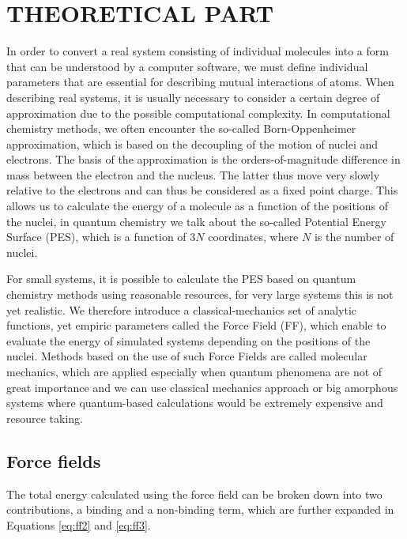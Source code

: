\newpage
\section{THEORETICAL PART}

In order to convert a real system consisting of individual molecules into a form that can be understood by a computer software, we must define individual parameters that are essential for describing mutual interactions of atoms. When describing real systems, it is usually necessary to consider a certain degree of approximation due to the possible computational complexity. In computational chemistry methods, we often encounter the so-called Born-Oppenheimer approximation, which is based on the decoupling of the motion of nuclei and electrons. The basis of the approximation is the orders-of-magnitude difference in mass between the electron and the nucleus. The latter thus move very slowly relative to the electrons and can thus be considered as a fixed point charge. This allows us to calculate the energy of a molecule as a function of the positions of the nuclei, in quantum chemistry we talk about the so-called Potential Energy Surface (PES), which is a function of 3$N$ coordinates, where $N$ is the number of nuclei. \cite{leach_molecular_2001} 

For small systems, it is possible to calculate the PES based on quantum chemistry methods using reasonable resources, for very large systems this is not yet realistic. We therefore introduce a classical-mechanics set of analytic functions, yet empiric parameters called the Force Field (FF), which enable to evaluate the energy of simulated systems depending on the positions of the nuclei. Methods based on the use of such Force Fields are called molecular mechanics, which are applied especially when quantum phenomena are not of great importance and we can use classical mechanics approach or big amorphous systems where quantum-based calculations would be extremely expensive and resource taking. \cite{monticelli_force_2013}

\subsection{Force fields}
The total energy calculated using the force field can be broken down into two contributions, a binding and a non-binding term, which are further expanded in Equations \ref{eq:ff2} and \ref{eq:ff3}.

